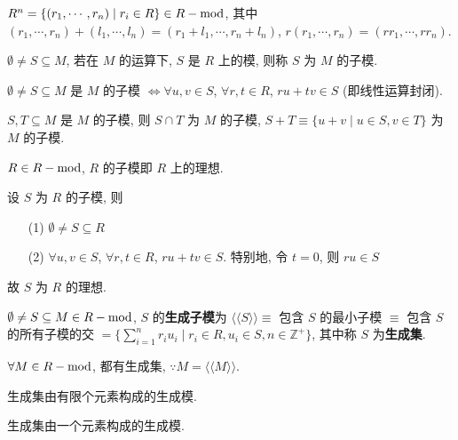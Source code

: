 \documentclass{note}
\begin{document}
\begin{eg}
    $R^n=\{(r_1,\cdots,r_n)\mid r_i\in R\}\in R-\operatorname{mod}$, 其中 $(r_1,\cdots,r_n)+(l_1,\cdots,l_n)=(r_1+l_1,\cdots,r_n+l_n)$, $r(r_1,\cdots,r_n)=(rr_1,\cdots,rr_n)$.
\end{eg}

\begin{df}[子模]
    $\emptyset\neq S\subseteq M$, 若在 $M$ 的运算下, $S$ 是 $R$ 上的模, 则称 $S$ 为 $M$ 的子模.
\end{df}

\begin{thm}
    $\emptyset\neq S\subseteq M$ 是 $M$ 的子模 $\Longleftrightarrow\forall u,v\in S$, $\forall r,t\in R$, $ru+tv\in S$ (即线性运算封闭).
\end{thm}

\begin{thm}[(课本定理 4.2)]
    $S,T\subseteq M$ 是 $M$ 的子模, 则 $S\cap T$ 为 $M$ 的子模, $S+T\equiv\{u+v\mid u\in S,v\in T\}$ 为 $M$ 的子模.
\end{thm}

\begin{thm}
    $R\in R-\operatorname{mod} $, $R$ 的子模即 $R$ 上的理想.
\end{thm}
\begin{pf}
    设 $S$ 为 $R$ 的子模, 则
    \begin{itemize}
        \item[(1)] $\emptyset\neq S\subseteq R$
        \item[(2)] $\forall u,v\in S$, $\forall r,t\in R$, $ru+tv\in S$. 特别地, 令 $t=0$, 则 $ru\in S$
    \end{itemize}
    故 $S$ 为 $R$ 的理想.
\end{pf}

\begin{df}[生成子模和生成集]
    $\emptyset\neq S\subseteq M\in R-\operatorname{mod}$, $S$ 的\textbf{生成子模}为 $\langle\langle S\rangle\rangle\equiv$ 包含 $S$ 的最小子模 $\equiv$ 包含 $S$ 的所有子模的交 $=\{\sum_{i=1}^nr_iu_i\mid r_i\in R,u_i\in S,n\in\mathbb{Z}^+\}$, 其中称 $S$ 为\textbf{生成集}.
\end{df}

$\forall M\in R-\operatorname{mod}$, 都有生成集, $\because M=\langle\langle M\rangle\rangle$.

\begin{df}[有限生成模]
    生成集由有限个元素构成的生成模.
\end{df}

\begin{df}[循环模]
    生成集由一个元素构成的生成模.
\end{df}
\end{document}
